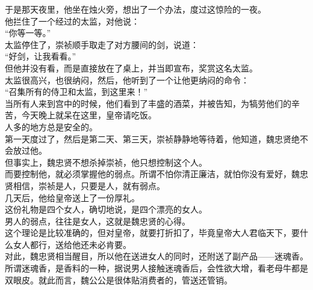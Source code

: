 \begin{multicols}{\theparacolNo}
于是那天夜里，他坐在烛火旁，想出了一个办法，度过这惊险的一夜。\\

他拦住了一个经过的太监，对他说：\\

“你等一等。”\\

太监停住了，崇祯顺手取走了对方腰间的剑，说道：\\

“好剑，让我看看。”\\

但他并没有看，而是直接放在了桌上，并当即宣布，奖赏这名太监。\\

太监很高兴，也很纳闷，然后，他听到了一个让他更纳闷的命令：\\

“召集所有的侍卫和太监，到这里来！”\\

当所有人来到宫中的时候，他们看到了丰盛的酒菜，并被告知，为犒劳他们的辛苦，今天晚上就呆在这里，皇帝请吃饭。\\

人多的地方总是安全的。\\

第一天度过了，然后是第二天、第三天，崇祯静静地等待着，他知道，魏忠贤绝不会放过他。\\

但事实上，魏忠贤不想杀掉崇祯，他只想控制这个人。\\

而要控制他，就必须掌握他的弱点。所谓不怕你清正廉洁，就怕你没有爱好，魏忠贤相信，崇祯是人，只要是人，就有弱点。\\

几天后，他给皇帝送上了一份厚礼。\\

这份礼物是四个女人，确切地说，是四个漂亮的女人。\\

男人的弱点，往往是女人，这就是魏忠贤的心得。\\

这个理论是比较准确的，但对皇帝，就要打折扣了，毕竟皇帝大人君临天下，要什么女人都行，送给他还未必肯要。\\

对此，魏忠贤相当醒目，所以他在送进女人的同时，还附送了副产品——迷魂香。\\

所谓迷魂香，是香料的一种，据说男人接触迷魂香后，会性欲大增，看老母牛都是双眼皮。就此而言，魏公公是很体贴消费者的，管送还管销。\\


\end{multicols}
